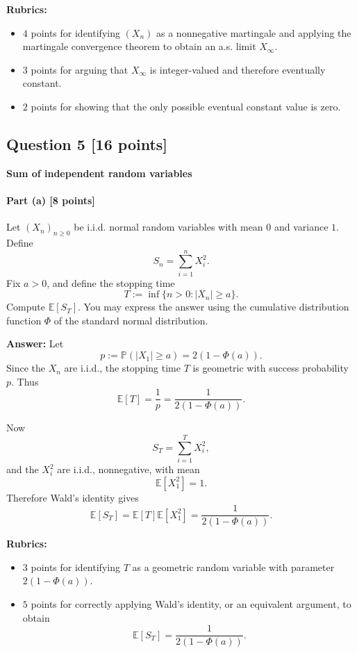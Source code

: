 \documentclass[11pt]{article}
\theoremstyle{definition}
\begin{document}
\textbf{Rubrics:}
\begin{itemize}[leftmargin=2em]
    \item \(4\) points for identifying \((X_n)\) as a nonnegative martingale and applying the martingale convergence theorem to obtain an a.s. limit \(X_\infty\).
    \item \(3\) points for arguing that \(X_\infty\) is integer-valued and therefore eventually constant.
    \item \(2\) points for showing that the only possible eventual constant value is zero.
\end{itemize}

\subsection*{Question 5 \hfill [16 points]}
\textbf{Sum of independent random variables}

\paragraph{Part (a) \hfill [8 points]}
Let \((X_n)_{n\ge 0}\) be i.i.d. normal random variables with mean \(0\) and variance \(1\). Define
\[
S_n=\sum_{i=1}^n X_i^2.
\]
Fix \(a>0\), and define the stopping time
\[
T:=\inf\{n>0:|X_n|\ge a\}.
\]
Compute \(\mathbb E[S_T]\). You may express the answer using the cumulative distribution function \(\Phi\) of the standard normal distribution.

\textbf{Answer:}
Let
\[
p:=\mathbb P(|X_1|\ge a)=2(1-\Phi(a)).
\]
Since the \(X_n\) are i.i.d., the stopping time \(T\) is geometric with success probability \(p\). Thus
\[
\mathbb E[T]=\frac{1}{p}=\frac{1}{2(1-\Phi(a))}.
\]

Now
\[
S_T=\sum_{i=1}^T X_i^2,
\]
and the \(X_i^2\) are i.i.d., nonnegative, with mean
\[
\mathbb E[X_1^2]=1.
\]
Therefore Wald's identity gives
\[
\mathbb E[S_T]=\mathbb E[T]\mathbb E[X_1^2]
=
\frac{1}{2(1-\Phi(a))}.
\]

\textbf{Rubrics:}
\begin{itemize}[leftmargin=2em]
    \item \(3\) points for identifying \(T\) as a geometric random variable with parameter \(2(1-\Phi(a))\).
    \item \(5\) points for correctly applying Wald's identity, or an equivalent argument, to obtain
    \[
    \mathbb E[S_T]=\frac{1}{2(1-\Phi(a))}.
    \]
\end{itemize}
\end{document}
